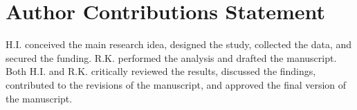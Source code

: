 \section*{Author Contributions Statement}
{}
\label{section:authorcontributions}
H.I. conceived the main research idea, designed the study, collected the data, and secured the funding. R.K. performed the analysis and drafted the manuscript. Both H.I. and R.K. critically reviewed the results, discussed the findings, contributed to the revisions of the manuscript, and approved the final version of the manuscript.